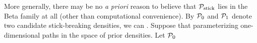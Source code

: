 More generally, there may be no {\em a priori} reason to believe that $\mathcal{P}_{\mathrm{stick}}$
lies in the Beta family at all (other than computational convenience). By
$\mathcal{P}_{0}$ and $\mathcal{P}_{1}$ denote two candidate stick-breaking densities, we can
. Suppose that
parameterizing one-dimensional paths in the space of prior densities.  Let
$\mathcal{P}_{0}$


%
%
%
%
%
%
